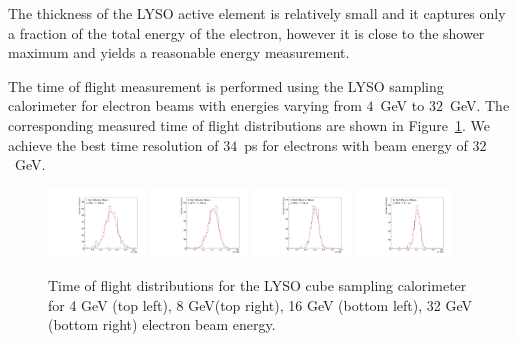 \documentclass[12pt]{article}
\begin{document}

The thickness of the LYSO active element is relatively small and it 
captures only a fraction of the total energy of the electron, however it is close to the shower maximum and yields a reasonable energy measurement.

The time of flight measurement is performed using the LYSO sampling calorimeter
for electron beams with energies varying from $4$~GeV to $32$~GeV. The corresponding 
measured time of flight distributions are shown in Figure~\ref{fig:LYSOCubeTOF}.
We achieve the best time resolution of $34$~ps for electrons
with beam energy of $32$~GeV.

\begin{figure}[H] \centering
\includegraphics[width=0.23\textwidth]{figs/TOF_Electron_LYSOCube_4GeV} 
\includegraphics[width=0.23\textwidth]{figs/TOF_Electron_LYSOCube_8GeV} 
\includegraphics[width=0.23\textwidth]{figs/TOF_Electron_LYSOCube_16GeV} 
\includegraphics[width=0.23\textwidth]{figs/TOF_Electron_LYSOCube_32GeV} 
\caption{ \small Time of flight distributions for the LYSO cube sampling calorimeter
for 4 GeV (top left), 8 GeV(top right), 16 GeV (bottom left),  32 GeV (bottom right) electron beam energy. } 
\label{fig:LYSOCubeTOF}
\end{figure}
\end{document}
